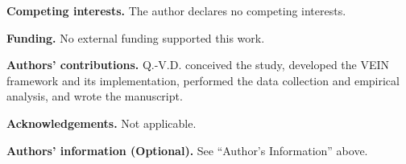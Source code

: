 \documentclass[11pt]{article}
\begin{document}
\vspace{0.8em}
\noindent\textbf{Competing interests.} The author declares no competing
interests.

\vspace{0.8em}
\noindent\textbf{Funding.} No external funding supported this work.

\vspace{0.8em}
\noindent\textbf{Authors' contributions.} Q.-V.D. conceived the study,
developed the VEIN framework and its implementation, performed the data
collection and empirical analysis, and wrote the manuscript.

\vspace{0.8em}
\noindent\textbf{Acknowledgements.} Not applicable.

\vspace{0.8em}
\noindent\textbf{Authors' information (Optional).} See ``Author's
Information'' above.
\end{document}
